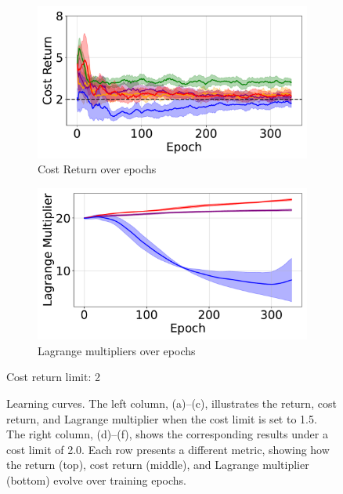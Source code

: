 \begin{figure}[H]
\begin{minipage}{0.48\textwidth}
        \begin{subfigure}{\linewidth}
            \centering
            \includegraphics[width=\linewidth]{figure/PointGoal/limit 2/EpCost.pdf}
            \caption{Cost Return over epochs}
        \end{subfigure}

        \begin{subfigure}{\linewidth}
            \centering
            \includegraphics[width=\linewidth]{figure/PointGoal/limit 2/lagrange.pdf}
            \caption{Lagrange multipliers over epochs}
        \end{subfigure}

        \caption*{Cost return limit: 2}
    \end{minipage}

    \caption{Learning curves.
            The left column, (a)–(c), illustrates the return, cost return, and Lagrange multiplier when the cost limit is set to 1.5. 
            The right column, (d)–(f), shows the corresponding results under a cost limit of 2.0. 
            Each row presents a different metric, showing how the return (top), cost return (middle), and Lagrange multiplier (bottom) evolve over training epochs.}
    \label{fig:point_goal_results_vertical2}
\end{figure}

